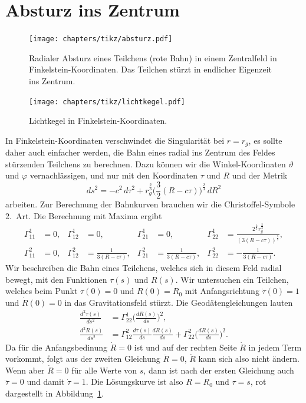\section{Absturz ins Zentrum}
\begin{figure}
\centering
\texttt{[image: chapters/tikz/absturz.pdf]}
\caption{Radialer Absturz eines Teilchens (rote Bahn) in einem Zentralfeld
in Finkelstein-Koordinaten.
Das Teilchen stürzt in endlicher Eigenzeit ins Zentrum.
\label{skript:kruemmung:fig:absturz}}
\end{figure}
\begin{figure}
\centering
\texttt{[image: chapters/tikz/lichtkegel.pdf]}
\caption{Lichtkegel in Finkelstein-Koordinaten.
\label{skript:kruemmung:fig:lichtkegel}}
\end{figure}
In Finkelstein-Koordinaten verschwindet die Singularität bei $r=r_g$,
es sollte daher auch einfacher werden, die Bahn eines radial ins
Zentrum des Feldes stürzenden Teilchens zu berechnen.
Dazu können wir die Winkel-Koordinaten $\vartheta$ und $\varphi$
vernachlässigen, und nur mit den Koordinaten $\tau$ und $R$ und der
Metrik
\[
ds^2
=
-c^2 \,d\tau^2
+r _g^{\frac23}\biggl(\frac32(R-c\tau)\biggr)^{\frac23}\,dR^2
\]
arbeiten.
Zur Berechnung der Bahnkurven brauchen wir die Christoffel-Symbole
2.~Art.
Die Berechnung mit Maxima ergibt
\begin{align*}
\Gamma^1_{11} &= 0,&
\Gamma^1_{12} &= 0,&
\Gamma^1_{21} &= 0,&
\Gamma^1_{22} &= \frac{2^{\frac23}r_g^{\frac23}}{(3(R-c\tau))^{\frac53}},\\
\Gamma^2_{11} &= 0,&
\Gamma^2_{12} &= \frac1{3(R-c\tau)},&
\Gamma^2_{21} &= \frac1{3(R-c\tau)},&
\Gamma^2_{22} &= -\frac1{3(R-c\tau)}.
\end{align*}
Wir beschreiben die Bahn eines Teilchens, welches sich in diesem Feld
radial bewegt, mit den Funktionen $\tau(s)$ und $R(s)$.
Wir untersuchen ein Teilchen, welches beim Punkt $\tau(0)=0$ und $R(0)=R_0$
mit Anfangsrichtung $\dot\tau(0)=1$ und $\dot R(0)=0$ in das Gravitationsfeld
stürzt.
Die Geodätengleichungen lauten
\begin{align*}
\frac{d^2\tau(s)}{ds^2}
&=
\Gamma^1_{22}\biggl(\frac{dR(s)}{ds}\biggr)^2,
\\
\frac{d^2R(s)}{ds^2}
&=
\Gamma^2_{12}\frac{d\tau(s)}{ds}\frac{dR(s)}{ds}
+
\Gamma^2_{22}\biggl(\frac{dR(s)}{ds}\biggr)^2.
\end{align*}
Da für die Anfangsbedinung $\dot R=0$ ist und auf der rechten Seite
$\dot R$ in jedem Term vorkommt, folgt aus der zweiten Gleichung
$\ddot R=0$, $\dot R$ kann sich also nicht ändern.
Wenn aber $\dot R=0$ für alle Werte von $s$, dann ist nach der ersten
Gleichung auch $\ddot \tau=0$ und damit $\dot \tau=1$.
Die Lösungskurve ist also $R=R_0$ und $\tau=s$, rot dargestellt in
Abbildung~\ref{skript:kruemmung:fig:absturz}.

